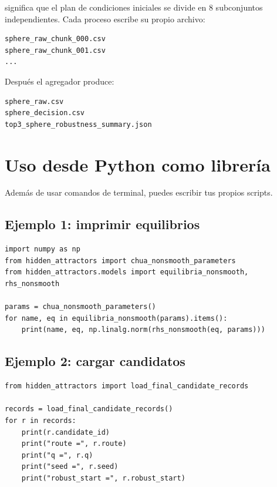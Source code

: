\documentclass[11pt,letterpaper]{article}
\begin{document}
significa que el plan de condiciones iniciales se divide en 8 subconjuntos independientes. Cada proceso escribe su propio archivo:

\begin{lstlisting}[style=terminal]
sphere_raw_chunk_000.csv
sphere_raw_chunk_001.csv
...
\end{lstlisting}

Después el agregador produce:

\begin{lstlisting}[style=terminal]
sphere_raw.csv
sphere_decision.csv
top3_sphere_robustness_summary.json
\end{lstlisting}

\section{Uso desde Python como librería}

Además de usar comandos de terminal, puedes escribir tus propios scripts.

\subsection{Ejemplo 1: imprimir equilibrios}

\begin{lstlisting}[style=python]
import numpy as np
from hidden_attractors import chua_nonsmooth_parameters
from hidden_attractors.models import equilibria_nonsmooth, rhs_nonsmooth

params = chua_nonsmooth_parameters()
for name, eq in equilibria_nonsmooth(params).items():
    print(name, eq, np.linalg.norm(rhs_nonsmooth(eq, params)))
\end{lstlisting}

\subsection{Ejemplo 2: cargar candidatos}

\begin{lstlisting}[style=python]
from hidden_attractors import load_final_candidate_records

records = load_final_candidate_records()
for r in records:
    print(r.candidate_id)
    print("route =", r.route)
    print("q =", r.q)
    print("seed =", r.seed)
    print("robust_start =", r.robust_start)
\end{lstlisting}
\end{document}

